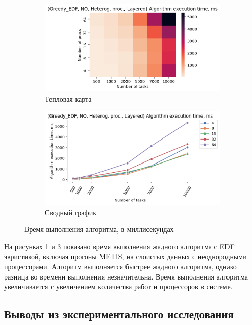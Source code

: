 \begin{figure}[!htbp]
    \centering
    \begin{subfigure}{0.49\textwidth}
        \includegraphics[width=\textwidth]{imgs/unbalanced/NO_EDF/et_heatmap.png}
        \caption{Тепловая карта}
        \label{fig:NO-unbalanced-EDF-exec-time-heatmap}
    \end{subfigure}
    \hfill
    \begin{subfigure}{0.49\textwidth}
        \includegraphics[width=\textwidth]{imgs/unbalanced/NO_EDF/tr_graph.png}
        \caption{Сводный график}
        \label{fig:NO-unbalanced-EDF-exec-time-compiled}
    \end{subfigure}
    \caption{Время выполнения алгоритма, в миллисекундах}
\end{figure}

На рисунках \ref{fig:NO-unbalanced-EDF-exec-time-heatmap} и \ref{fig:NO-unbalanced-EDF-exec-time-compiled} показано время выполнения жадного алгоритма с EDF эвристикой, включая прогоны METIS, на слоистых данных с неоднородными процессорами. Алгоритм выполняется быстрее жадного алгоритма, однако разница во времени выполнения незначительна. Время выполнения алгоритма увеличивается с увеличением количества работ и процессоров в системе.

\subsection{Выводы из экспериментального исследования}